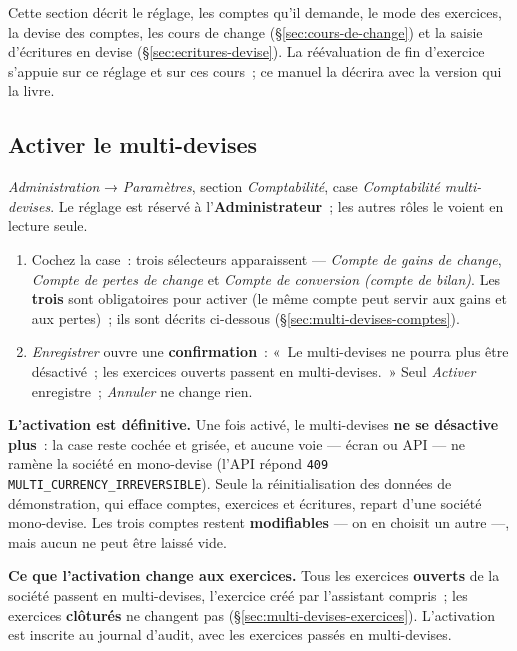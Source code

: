 \documentclass[a4paper,11pt,oneside]{article}
\begin{document}
Cette section décrit le réglage, les comptes qu'il demande, le mode des exercices, la devise des comptes, les cours de change (\S\ref{sec:cours-de-change}) et la saisie d'écritures en devise (\S\ref{sec:ecritures-devise}). La réévaluation de fin d'exercice s'appuie sur ce réglage et sur ces cours~; ce manuel la décrira avec la version qui la livre.

\subsection{Activer le multi-devises}

\emph{Administration} → \emph{Paramètres}, section \emph{Comptabilité}, case \emph{Comptabilité multi-devises}. Le réglage est réservé à l'\textbf{Administrateur}~; les autres rôles le voient en lecture seule.

\begin{enumerate}
    \item Cochez la case~: trois sélecteurs apparaissent --- \emph{Compte de gains de change}, \emph{Compte de pertes de change} et \emph{Compte de conversion (compte de bilan)}. Les \textbf{trois} sont obligatoires pour activer (le même compte peut servir aux gains et aux pertes)~; ils sont décrits ci-dessous (\S\ref{sec:multi-devises-comptes}).
    \item \emph{Enregistrer} ouvre une \textbf{confirmation}~: «~Le multi-devises ne pourra plus être désactivé~; les exercices ouverts passent en multi-devises.~» Seul \emph{Activer} enregistre~; \emph{Annuler} ne change rien.
\end{enumerate}

\begin{keshwarning}
\textbf{L'activation est définitive.} Une fois activé, le multi-devises \textbf{ne se désactive plus}~: la case reste cochée et grisée, et aucune voie --- écran ou API --- ne ramène la société en mono-devise (l'API répond \texttt{409 MULTI\_\allowbreak CURRENCY\_\allowbreak IRREVERSIBLE}). Seule la réinitialisation des données de démonstration, qui efface comptes, exercices et écritures, repart d'une société mono-devise. Les trois comptes restent \textbf{modifiables} --- on en choisit un autre ---, mais aucun ne peut être laissé vide.
\end{keshwarning}

\textbf{Ce que l'activation change aux exercices.} Tous les exercices \textbf{ouverts} de la société passent en multi-devises, l'exercice créé par l'assistant compris~; les exercices \textbf{clôturés} ne changent pas (\S\ref{sec:multi-devises-exercices}). L'activation est inscrite au journal d'audit, avec les exercices passés en multi-devises.
\end{document}
